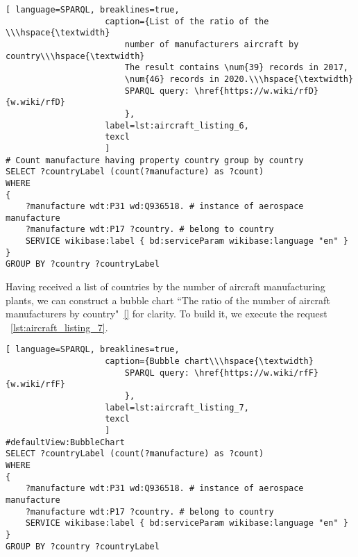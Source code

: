 \begin{lstlisting}[ language=SPARQL, breaklines=true, 
                    caption={List of the ratio of the \\\hspace{\textwidth} 
						number of manufacturers aircraft by country\\\hspace{\textwidth}
                        The result contains \num{39} records in 2017, 
                        \num{46} records in 2020.\\\hspace{\textwidth}
                        SPARQL query: \href{https://w.wiki/rfD}{w.wiki/rfD}
                        },
                    label=lst:aircraft_listing_6,
                    texcl 
                    ]
# Count manufacture having property country group by country
SELECT ?countryLabel (count(?manufacture) as ?count)
WHERE
{
    ?manufacture wdt:P31 wd:Q936518. # instance of aerospace manufacture
  	?manufacture wdt:P17 ?country. # belong to country
    SERVICE wikibase:label { bd:serviceParam wikibase:language "en" }
}
GROUP BY ?country ?countryLabel
\end{lstlisting}

Having received a list of countries by the number of aircraft manufacturing plants, we can construct a bubble chart 
``The ratio of the number of aircraft manufacturers by country"~\ref{} for clarity. To build it, we execute the request ~\ref{lst:aircraft_listing_7}.

\begin{lstlisting}[ language=SPARQL, breaklines=true, 
                    caption={Bubble chart\\\hspace{\textwidth}
                        SPARQL query: \href{https://w.wiki/rfF}{w.wiki/rfF}
                        },
                    label=lst:aircraft_listing_7,
                    texcl 
                    ]
#defaultView:BubbleChart
SELECT ?countryLabel (count(?manufacture) as ?count)
WHERE
{
    ?manufacture wdt:P31 wd:Q936518. # instance of aerospace manufacture
  	?manufacture wdt:P17 ?country. # belong to country
    SERVICE wikibase:label { bd:serviceParam wikibase:language "en" }
}
GROUP BY ?country ?countryLabel
\end{lstlisting}

